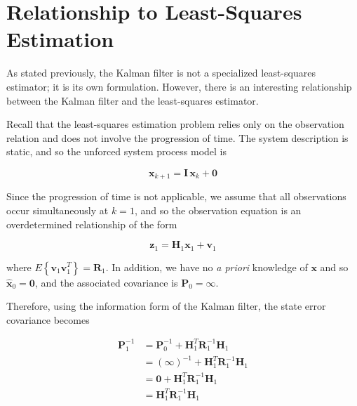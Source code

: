 \section{Relationship to Least-Squares Estimation}
\label{Relationship to Least-Squares Estimation}

As stated previously, the Kalman filter is not a specialized least-squares estimator;
it is its own formulation. However, there is an interesting relationship between the
Kalman filter and the least-squares estimator.

Recall that the least-squares estimation problem relies only on the observation relation
and does not involve the progression of time. The system description is static, and so
the unforced system process model is

\begin{equation*}
    \mathbf{x}_{k+1} = \mathbf{I} \, \mathbf{x}_k + \mathbf{0}
\end{equation*}

Since the progression of time is not applicable, we assume that all observations occur
simultaneously at $k = 1$, and so the observation equation is an overdetermined relationship
of the form

\begin{equation*}
    \mathbf{z}_1 = \mathbf{H}_1 \mathbf{x}_1 + \mathbf{v}_1
\end{equation*}

where $E \left\{ \mathbf{v}_1 \mathbf{v}_1^T \right\} = \mathbf{R}_1$. In addition,
we have no \textit{a priori} knowledge of $\mathbf{x}$ and so $\hat{\mathbf{x}}_0 = \mathbf{0}$,
and the associated covariance is $\mathbf{P}_0 = \mathbf{\infty}$.

Therefore, using the information form of the Kalman filter, the state error covariance becomes

\begin{equation*}
    \begin{aligned}
        \mathbf{P}_1^{-1} &= \mathbf{P}_0^{-1} + \mathbf{H}_1^T \mathbf{R}_1^{-1} \mathbf{H}_1 \\
        &= \left( \mathbf{\infty} \right)^{-1} + \mathbf{H}_1^T \mathbf{R}_1^{-1} \mathbf{H}_1 \\
        &= \mathbf{0} + \mathbf{H}_1^T \mathbf{R}_1^{-1} \mathbf{H}_1 \\
        &= \mathbf{H}_1^T \mathbf{R}_1^{-1} \mathbf{H}_1
    \end{aligned}
\end{equation*}

